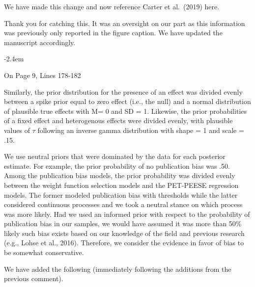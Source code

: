 \documentclass[final]{article}
\renewenvironment{quote}{\begin{fquote}\advance\leftmargini -2.4em\begin{oldquote}}{\end{oldquote}\end{fquote}}
\newenvironment{fquote}
  {\def\FrameCommand{
	\fboxsep=0.6em %
	\fcolorbox{black}{white}}%
    \MakeFramed {\advance\hsize-2\width \FrameRestore}
    \begin{minipage}{\linewidth}
  }
  {\end{minipage}\endMakeFramed}
\begin{document}
We have made this change and now reference Carter et al.~(2019) here.


Thank you for catching this. It was an oversight on our part as this information was previously only reported in the figure caption. We have updated the manuscript accordingly.

\begin{quote}
On Page 9, Lines 178-182

Similarly, the prior distribution for the presence of an effect was divided evenly between a spike prior equal to zero effect (i.e., the null) and a normal distribution of plausible true effects with M= 0 and SD = 1. Likewise, the prior probabilities of a fixed effect and heterogenous effects were divided evenly, with plausible values of \(\tau\) following an inverse gamma distribution with shape = 1 and scale = .15.
\end{quote}


We use neutral priors that were dominated by the data for each posterior estimate. For example, the prior probability of no publication bias was .50. Among the publication bias models, the prior probability was divided evenly between the weight function selection models and the PET-PEESE regression models. The former modeled publication bias with thresholds while the latter considered continuous processes and we took a neutral stance on which process was more likely. Had we used an informed prior with respect to the probability of publication bias in our samples, we would have assumed it was more than 50\% likely such bias exists based on our knowledge of the field and previous research (e.g., Lohse et al., 2016). Therefore, we consider the evidence in favor of bias to be somewhat conservative.

We have added the following (immediately following the additions from the previous comment).
\end{document}
